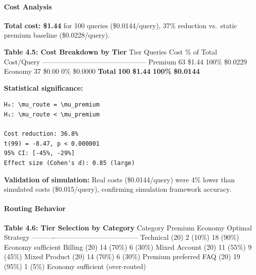 \documentclass[
  11pt,
]{article}
\begin{document}
\hypertarget{cost-analysis-2}{%
\paragraph{Cost Analysis}\label{cost-analysis-2}}

\textbf{Total cost: \$1.44} for 100 queries (\$0.0144/query), 37\%
reduction vs.~static premium baseline (\$0.0228/query).

\textbf{Table 4.5: Cost Breakdown by Tier} \textbar{} Tier \textbar{}
Queries \textbar{} Cost \textbar{} \% of Total \textbar{} Cost/Query
\textbar{}
\textbar------\textbar---------\textbar------\textbar------------\textbar------------\textbar{}
\textbar{} Premium \textbar{} 63 \textbar{} \$1.44 \textbar{} 100\%
\textbar{} \$0.0229 \textbar{} \textbar{} Economy \textbar{} 37
\textbar{} \$0.00 \textbar{} 0\% \textbar{} \$0.0000 \textbar{}
\textbar{} \textbf{Total} \textbar{} \textbf{100} \textbar{}
\textbf{\$1.44} \textbar{} \textbf{100\%} \textbar{} \textbf{\$0.0144}
\textbar{}

\textbf{Statistical significance:}

\begin{verbatim}
H₀: \mu_route = \mu_premium
H₁: \mu_route < \mu_premium

Cost reduction: 36.8%
t(99) = -8.47, p < 0.000001
95% CI: [-45%, -29%]
Effect size (Cohen's d): 0.85 (large)
\end{verbatim}

\textbf{Validation of simulation:} Real costs (\$0.0144/query) were 4\%
lower than simulated costs (\$0.015/query), confirming simulation
framework accuracy.

\hypertarget{routing-behavior}{%
\paragraph{Routing Behavior}\label{routing-behavior}}

\textbf{Table 4.6: Tier Selection by Category} \textbar{} Category
\textbar{} Premium \textbar{} Economy \textbar{} Optimal Strategy
\textbar{}
\textbar----------\textbar---------\textbar---------\textbar------------------\textbar{}
\textbar{} Technical (20) \textbar{} 2 (10\%) \textbar{} 18 (90\%)
\textbar{} Economy sufficient \textbar{} \textbar{} Billing (20)
\textbar{} 14 (70\%) \textbar{} 6 (30\%) \textbar{} Mixed \textbar{}
\textbar{} Account (20) \textbar{} 11 (55\%) \textbar{} 9 (45\%)
\textbar{} Mixed \textbar{} \textbar{} Product (20) \textbar{} 14 (70\%)
\textbar{} 6 (30\%) \textbar{} Premium preferred \textbar{} \textbar{}
FAQ (20) \textbar{} 19 (95\%) \textbar{} 1 (5\%) \textbar{} Economy
sufficient (over-routed) \textbar{}
\end{document}
